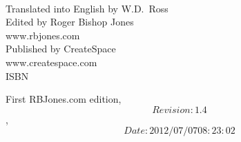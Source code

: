 \begin{titlepage}
\maketitle

\ 
\\

\vfill

\begin{centering}



\vfill



Translated into English by W.D.~Ross\\
\vspace{0.1in}
Edited by Roger Bishop Jones\\
\vspace{0.05in}
www.rbjones.com\\
\vspace{0.1in}
Published by CreateSpace\\
\vspace{0.05in}
www.createspace.com\\
\vspace{0.2in}
ISBN\\

\vspace{0.2in}

{\footnotesize



First RBJones.com edition, $$Revision: 1.4 $$, $$Date: 2012/07/07 08:23:02 $$


}%

\end{centering}


\thispagestyle{empty}
\end{titlepage}


{\parskip=0pt\tableofcontents}

\vfill

